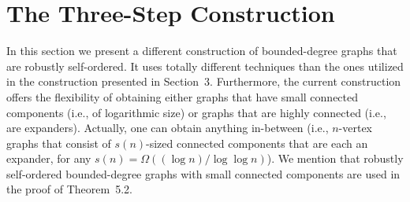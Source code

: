 















































































\setcounter{section}{3}\section{The Three-Step Construction}
\label{three-step:sec}
In this section we present a different construction
of bounded-degree graphs that are robustly self-ordered.
It uses totally different techniques than the ones utilized
in the construction presented in Section~3.
Furthermore, the current construction offers the flexibility
of obtaining either graphs that have small connected components
(i.e., of logarithmic size)
or graphs that are highly connected (i.e., are expanders).
Actually, one can obtain anything in-between
(i.e., $n$-vertex graphs that consist of $s(n)$-sized
connected components that are each an expander,
for any $s(n)=\Omega((\log n)/\log\log n)$).
We mention that robustly self-ordered bounded-degree graphs
with small connected components are used in the proof
of Theorem~5.2.

